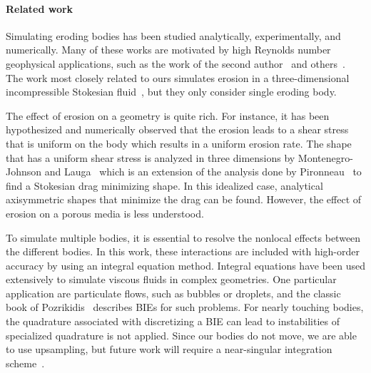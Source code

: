 \documentclass[preprint, 10pt]{elsarticle}
\begin{document}
\paragraph{Related work} Simulating eroding bodies has been studied
analytically, experimentally, and numerically.  Many of these works are
motivated by high Reynolds number geophysical applications, such as the
work of the second author~\cite{moo-ris-chi-zha-she2013,
ris-moo-chi-she-zha2012, moore2017riemann} and others~\cite{par-izu2000,
lag2000, coh-dev-sey-yi-szy-rot2015, han1969, Rothman2012,
hewett2017evolution, ristroph2018sculpting, lopez2018cfd,
lachaussee2018competitive, cohen2016erosion}.  The work most closely
related to ours simulates erosion in a three-dimensional incompressible
Stokesian fluid~\cite{mit-spa2016}, but they only consider single
eroding body.  

The effect of erosion on a geometry is quite rich.  For instance, it has
been hypothesized and numerically observed that the erosion leads to a
shear stress that is uniform on the body which results in a uniform
erosion rate.  The shape that has a uniform shear stress is analyzed in
three dimensions by Montenegro-Johnson and Lauga~\cite{mon-lau2015}
which is an extension of the analysis done by Pironneau~\cite{pir1973}
to find a Stokesian drag minimizing shape.  In this idealized case,
analytical axisymmetric shapes that minimize the drag can be found.
However, the effect of erosion on a porous media is less understood.

To simulate multiple bodies, it is essential to resolve the nonlocal
effects between the different bodies.  In this work, these interactions
are included with high-order accuracy by using an integral equation
method.  Integral equations have been used extensively to simulate
viscous fluids in complex geometries.  One particular application are
particulate flows, such as bubbles or droplets, and the classic book of
Pozrikidis~\cite{poz1992} describes BIEs for such problems.  For nearly
touching bodies, the quadrature associated with discretizing a BIE can
lead to instabilities of specialized quadrature is not applied.  Since
our bodies do not move, we are able to use upsampling, but future work
will require a near-singular integration scheme~\cite{qua-bir2014a,
klo-bar-gre-one2013, bar-wu-vee2015, hel-oja2008a, bea-lai2001}.


\end{document}
